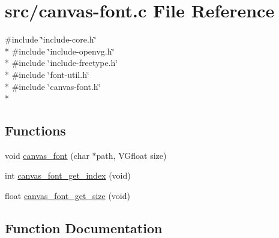 \hypertarget{canvas-font_8c}{}\section{src/canvas-\/font.c File Reference}
\label{canvas-font_8c}
{\ttfamily \#include \char`\"{}include-\/core.\+h\char`\"{}}\\*
{\ttfamily \#include \char`\"{}include-\/openvg.\+h\char`\"{}}\\*
{\ttfamily \#include \char`\"{}include-\/freetype.\+h\char`\"{}}\\*
{\ttfamily \#include \char`\"{}font-\/util.\+h\char`\"{}}\\*
{\ttfamily \#include \char`\"{}canvas-\/font.\+h\char`\"{}}\\*
\subsection*{Functions}
\begin{DoxyCompactItemize}
\item 
void \hyperlink{canvas-font_8c_ab6757907ce66133ef459eaf98d8d372b}{canvas\+\_\+font} (char $\ast$path, V\+Gfloat size)
\item 
int \hyperlink{canvas-font_8c_a5bc1febd844b66e157c6c35d4f2ac7d1}{canvas\+\_\+font\+\_\+get\+\_\+index} (void)
\item 
float \hyperlink{canvas-font_8c_a4c43b0f98c5439d79a3c1ac960b8f591}{canvas\+\_\+font\+\_\+get\+\_\+size} (void)
\end{DoxyCompactItemize}


\subsection{Function Documentation}
\hypertarget{canvas-font_8c_ab6757907ce66133ef459eaf98d8d372b}{}
